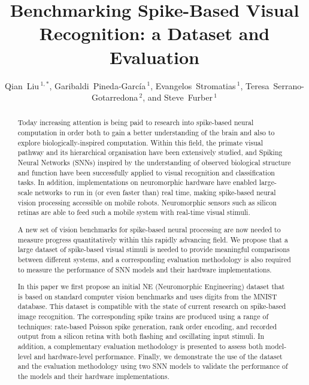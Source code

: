 \documentclass{frontiersENG} %
\def\firstAuthorLast{Qian Liu {et~al.}} %
\def\Authors{Qian~Liu\,$^{1,*}$, Garibaldi~Pineda-Garc\'ia\,$^{1}$, Evangelos~Stromatias\,$^{1}$, Teresa~Serrano-Gotarredona\,$^{2}$, and Steve~Furber\,$^{1}$}
\begin{document}
\onecolumn
{}

\title[Benchmarking Spike-Based Visual Recognition: a Dataset and Evaluation]{Benchmarking  Spike-Based Visual Recognition: a Dataset and Evaluation}
\author[\firstAuthorLast ]{\Authors}
\address{}
\correspondance{}
\extraAuth{}%
\topic{}

\maketitle
\begin{abstract}

Today increasing attention is being paid to research into spike-based neural computation in order both to gain a better understanding of the brain and also to explore biologically-inspired computation.
Within this field, the primate visual pathway and its hierarchical organisation have been extensively studied, and
Spiking Neural Networks (SNNs) inspired by the understanding of observed biological structure and function have been successfully applied to visual recognition and classification tasks.
In addition, implementations on neuromorphic hardware have enabled large-scale networks to run in (or even faster than) real time, making spike-based neural vision processing accessible on mobile robots.
Neuromorphic sensors such as silicon retinas are able to feed such a mobile system with real-time visual stimuli.

A new set of vision benchmarks for spike-based neural processing are now needed to measure progress quantitatively within this rapidly advancing field.
We propose that a large dataset of spike-based visual stimuli is needed to provide meaningful comparisons between different systems, and a corresponding evaluation methodology is also required to measure the performance of SNN models and their hardware implementations.

In this paper we first propose an initial NE (Neuromorphic Engineering) dataset that is based on standard computer vision benchmarks and uses digits from the MNIST database. This dataset is compatible with the state of current research on spike-based image recognition.
The corresponding spike trains are produced using a range of techniques: rate-based Poisson spike generation, rank order encoding, and recorded output from a silicon retina with both flashing and oscillating input stimuli.
In addition, a complementary evaluation methodology is presented to assess both model-level and hardware-level performance.
Finally, we demonstrate the use of the dataset and the evaluation methodology using two SNN models to validate the performance of the models and their hardware implementations.


\end{abstract}
\end{document}

